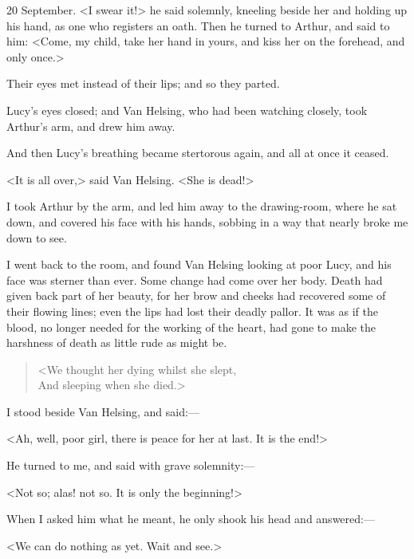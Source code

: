 \begin{diary}{20 September.}
<I swear it!> he said solemnly, kneeling beside her and holding up his hand, as one who registers an oath. Then he turned to Arthur, and said to him: <Come, my child, take her hand in yours, and kiss her on the forehead, and only once.>

Their eyes met instead of their lips; and so they parted.

Lucy's eyes closed; and Van Helsing, who had been watching closely, took Arthur's arm, and drew him away.

And then Lucy's breathing became stertorous again, and all at once it ceased.

<It is all over,> said Van Helsing. <She is dead!>

I took Arthur by the arm, and led him away to the drawing-room, where he sat down, and covered his face with his hands, sobbing in a way that nearly broke me down to see.

I went back to the room, and found Van Helsing looking at poor Lucy, and his face was sterner than ever. Some change had come over her body. Death had given back part of her beauty, for her brow and cheeks had recovered some of their flowing lines; even the lips had lost their deadly pallor. It was as if the blood, no longer needed for the working of the heart, had gone to make the harshness of death as little rude as might be.

\begin{verse}<We thought her dying whilst she slept,\\
And sleeping when she died.>
\end{verse}

I stood beside Van Helsing, and said:—

<Ah, well, poor girl, there is peace for her at last. It is the end!>

He turned to me, and said with grave solemnity:—

<Not so; alas! not so. It is only the beginning!>

When I asked him what he meant, he only shook his head and answered:—

<We can do nothing as yet. Wait and see.>
\end{diary}